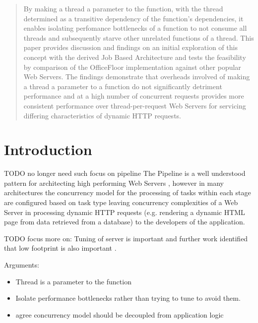 \documentclass[conference]{ieee/IEEEtran}
\begin{document}
\begin{abstract}
By making a thread a parameter to the function, with the thread determined as a
transitive dependency of the function's dependencies, it enables isolating
perfomance bottlenecks of a function to not consume all threads and
subsequently starve other unrelated functions of a thread.  This paper provides
discussion and findings on an initial exploration of this concept with the
derived Job Based Architecture and tests the feasibility by comparison of the
OfficeFloor implementation against other popular Web Servers.  The findings
demonstrate that overheads involved of making a thread a parameter to a
function do not significantly detriment performance and at a high number of
concurrent requests provides more consistent performance over
thread-per-request Web Servers for servicing differing characteristics of
dynamic HTTP requests.
\end{abstract}




%
\IEEEpeerreviewmaketitle



\section{Introduction}

TODO no longer need such focus on pipeline The Pipeline \cite{pipeline} is a
well understood pattern for architecting high performing Web Servers
\cite{multithread-pipeline,knot-userver-watpipe,seda}, however in many
architectures \cite{multithread-pipeline,flux,aspen} the concurrency model for
the processing of tasks within each stage are configured based on task type
leaving concurrency complexities of a Web Server in processing dynamic HTTP
requests (e.g. rendering a dynamic HTML page from data retrieved from a
database) to the developers of the application.

TODO focus more on:
Tuning of server is important \cite{tuning-important} and further work
identified that low footprint is also important \cite{knot-userver-watpipe}.

Arguments:
\begin{itemize}
  \item Thread is a parameter to the function
  \item Isolate performance bottlenecks rather than trying to tune to avoid
  them.
  \item agree concurrency model should be decoupled from application logic
\end{itemize}
\end{document}
